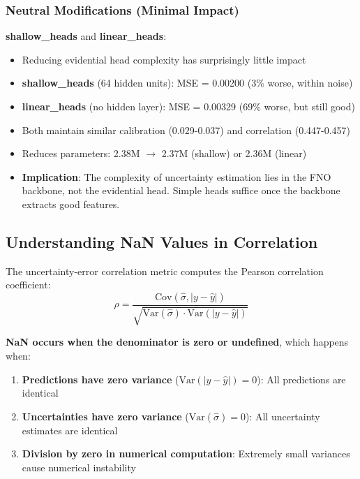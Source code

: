 \subsubsection{Neutral Modifications (Minimal Impact)}

\textbf{shallow\_heads} and \textbf{linear\_heads}:
\begin{itemize}
\item Reducing evidential head complexity has surprisingly little impact
\item \textbf{shallow\_heads} (64 hidden units): MSE = 0.00200 (3\% worse, within noise)
\item \textbf{linear\_heads} (no hidden layer): MSE = 0.00329 (69\% worse, but still good)
\item Both maintain similar calibration (0.029-0.037) and correlation (0.447-0.457)
\item Reduces parameters: 2.38M $\to$ 2.37M (shallow) or 2.36M (linear)
\item \textbf{Implication}: The complexity of uncertainty estimation lies in the FNO backbone, not the evidential head. Simple heads suffice once the backbone extracts good features.
\end{itemize}

\subsection{Understanding NaN Values in Correlation}

The uncertainty-error correlation metric computes the Pearson correlation coefficient:
\begin{equation}
\rho = \frac{\text{Cov}(\hat{\sigma}, |y - \hat{y}|)}{\sqrt{\text{Var}(\hat{\sigma}) \cdot \text{Var}(|y - \hat{y}|)}}
\end{equation}

\textbf{NaN occurs when the denominator is zero or undefined}, which happens when:
\begin{enumerate}
\item \textbf{Predictions have zero variance} ($\text{Var}(|y - \hat{y}|) = 0$): All predictions are identical
\item \textbf{Uncertainties have zero variance} ($\text{Var}(\hat{\sigma}) = 0$): All uncertainty estimates are identical
\item \textbf{Division by zero in numerical computation}: Extremely small variances cause numerical instability
\end{enumerate}

